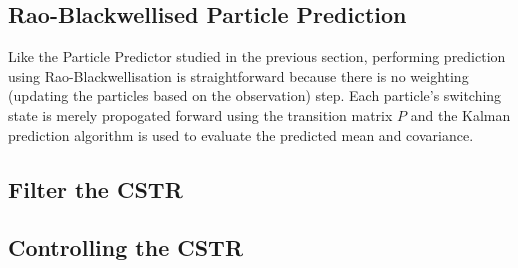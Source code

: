 \documentclass[../masters.tex]{subfiles}
\begin{document}
\subsection{Rao-Blackwellised Particle Prediction}
Like the Particle Predictor studied in the previous section, performing prediction using Rao-Blackwellisation is straightforward because there is no weighting (updating the particles based on the observation) step. Each particle's switching state is merely propogated forward using the transition matrix $P$ and the Kalman prediction algorithm is used to evaluate the predicted mean and covariance.

\subsection{Filter the CSTR}

\subsection{Controlling the CSTR}




\end{document}
